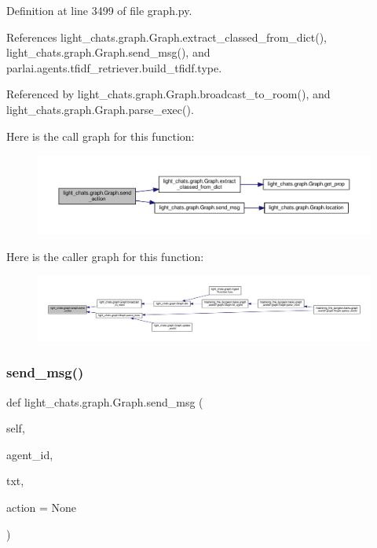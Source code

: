 Definition at line 3499 of file graph.\+py.



References light\+\_\+chats.\+graph.\+Graph.\+extract\+\_\+classed\+\_\+from\+\_\+dict(), light\+\_\+chats.\+graph.\+Graph.\+send\+\_\+msg(), and parlai.\+agents.\+tfidf\+\_\+retriever.\+build\+\_\+tfidf.\+type.



Referenced by light\+\_\+chats.\+graph.\+Graph.\+broadcast\+\_\+to\+\_\+room(), and light\+\_\+chats.\+graph.\+Graph.\+parse\+\_\+exec().

Here is the call graph for this function\+:
\nopagebreak
\begin{figure}[H]
\begin{center}
\leavevmode
\includegraphics[width=350pt]{classlight__chats_1_1graph_1_1Graph_a783ebf83adeed30c0ba89679f535d33c_cgraph}
\end{center}
\end{figure}
Here is the caller graph for this function\+:
\nopagebreak
\begin{figure}[H]
\begin{center}
\leavevmode
\includegraphics[width=350pt]{classlight__chats_1_1graph_1_1Graph_a783ebf83adeed30c0ba89679f535d33c_icgraph}
\end{center}
\end{figure}
\mbox{\label{classlight__chats_1_1graph_1_1Graph_a966d3719771ddc58c520f0821c18d959}} 
\subsubsection{\texorpdfstring{send\+\_\+msg()}{send\_msg()}}
{\footnotesize\ttfamily def light\+\_\+chats.\+graph.\+Graph.\+send\+\_\+msg (\begin{DoxyParamCaption}\item[{}]{self,  }\item[{}]{agent\+\_\+id,  }\item[{}]{txt,  }\item[{}]{action = {\ttfamily None} }\end{DoxyParamCaption})}

